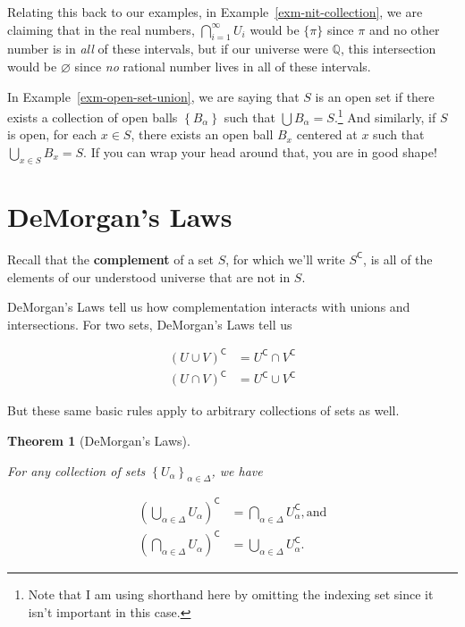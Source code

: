 \documentclass[
  letterpaper,
  DIV=11,
  numbers=noendperiod]{scrreprt}
\def\Q{\mathbb Q}
\newcommand{\cee}{\mathsf{C}}
\theoremstyle{plain}
\newtheorem{theorem}{Theorem}[chapter]
\theoremstyle{definition}
\theoremstyle{plain}
\theoremstyle{plain}
\theoremstyle{definition}
\theoremstyle{definition}
\theoremstyle{remark}
\begin{document}
Relating this back to our examples, in Example~\ref{exm-nit-collection},
we are claiming that in the real numbers,
\(\displaystyle \bigcap_{i=1}^\infty U_i\) would be \(\{\pi\}\) since
\(\pi\) and no other number is in \emph{all} of these intervals, but if
our universe were \(\Q\), this intersection would be \(\varnothing\)
since \emph{no} rational number lives in all of these intervals.

In Example~\ref{exm-open-set-union}, we are saying that \(S\) is an open
set if there exists a collection of open balls
\(\left\{B_\alpha\right\}\) such that \(\bigcup B_\alpha=S.\)\footnote{Note
  that I am using shorthand here by omitting the indexing set since it
  isn't important in this case.} And similarly, if \(S\) is open, for
each \(x\in S\), there exists an open ball \(B_x\) centered at \(x\)
such that \(\displaystyle \bigcup_{x\in S} B_x =S\). If you can wrap
your head around that, you are in good shape!

\section{DeMorgan's Laws}\label{demorgans-laws}

Recall that the \textbf{complement} of a set \(S\), for which we'll
write \(S^\cee\), is all of the elements of our understood universe that
are not in \(S\).

DeMorgan's Laws tell us how complementation interacts with unions and
intersections. For two sets, DeMorgan's Laws tell us

\[\begin{aligned}
  (U\cup V)^\cee&=U^\cee \cap V^\cee \\
  (U\cap V)^\cee&=U^\cee \cup V^\cee
\end{aligned}\]

But these same basic rules apply to arbitrary collections of sets as
well.

\begin{theorem}[DeMorgan's
Laws]\protect\hypertarget{thm-demorgan}{}\label{thm-demorgan}

For any collection of sets
\(\left\{U_\alpha\right\}_{\alpha\in\Delta}\), we have

\[\begin{aligned}
  \left(\bigcup_{\alpha\in\Delta} U_\alpha\right)^\cee &= \bigcap_{\alpha\in\Delta} U_\alpha^\cee, \text{and} \\
  \left(\bigcap_{\alpha\in\Delta} U_\alpha\right)^\cee &= \bigcup_{\alpha\in\Delta} U_\alpha^\cee. 
\end{aligned}\]

\end{theorem}
\end{document}

